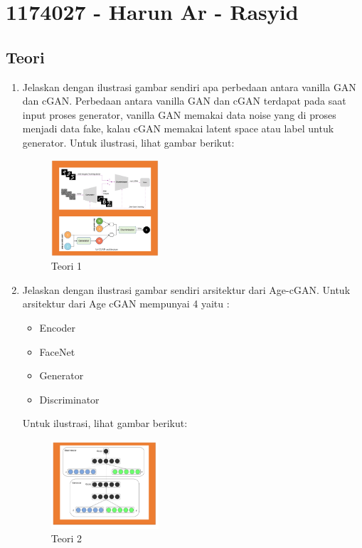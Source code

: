 \section{1174027 - Harun Ar - Rasyid}
\subsection{Teori}
\begin{enumerate}
    \item Jelaskan dengan ilustrasi gambar sendiri apa perbedaan antara vanilla GAN dan cGAN.
	\hfill\break
	Perbedaan antara vanilla GAN dan cGAN terdapat pada saat input proses generator, vanilla GAN memakai data noise yang di proses menjadi data fake, kalau cGAN memakai latent space atau label untuk generator. Untuk ilustrasi, lihat gambar berikut: 
    \begin{figure}[H]
		\includegraphics[width=4cm]{figures/1174027/9/teori1.png}
		\centering
		\caption{Teori 1}
	\end{figure}
	
	\item Jelaskan dengan ilustrasi gambar sendiri arsitektur dari Age-cGAN.
	\hfill\break
	Untuk arsitektur dari Age cGAN mempunyai 4 yaitu :
	\begin{itemize}
		\item Encoder
		\item FaceNet
		\item Generator
		\item Discriminator
	\end{itemize}
	Untuk ilustrasi, lihat gambar berikut: 
	\begin{figure}[H]
		\includegraphics[width=4cm]{figures/1174027/9/teori2.png}
		\centering
		\caption{Teori 2}
	\end{figure}


\end{enumerate}
